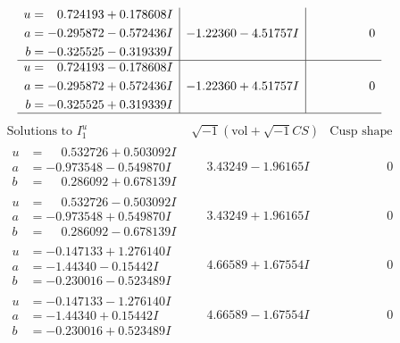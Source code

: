 \documentclass[1p]{elsarticle_modified}
\theoremstyle{definition}
\newcommand{\I}{\sqrt{-1}}
\begin{document}
$$\begin{array}{c|c|c}
\begin{aligned}
u &= \phantom{-}0.724193 + 0.178608 I \\
a &= -0.295872 - 0.572436 I \\
b &= -0.325525 - 0.319339 I\end{aligned}
 & -1.22360 - 4.51757 I & \phantom{-0.000000 } 0 \\ \hline\begin{aligned}
u &= \phantom{-}0.724193 - 0.178608 I \\
a &= -0.295872 + 0.572436 I \\
b &= -0.325525 + 0.319339 I\end{aligned}
 & -1.22360 + 4.51757 I & \phantom{-0.000000 } 0\\
 \hline 
 \end{array}$$\newpage$$\begin{array}{c|c|c}  
\text{Solutions to }I^u_{1}& \I (\text{vol} + \sqrt{-1}CS) & \text{Cusp shape}\\
 \hline 
\begin{aligned}
u &= \phantom{-}0.532726 + 0.503092 I \\
a &= -0.973548 - 0.549870 I \\
b &= \phantom{-}0.286092 + 0.678139 I\end{aligned}
 & \phantom{-}3.43249 - 1.96165 I & \phantom{-0.000000 } 0 \\ \hline\begin{aligned}
u &= \phantom{-}0.532726 - 0.503092 I \\
a &= -0.973548 + 0.549870 I \\
b &= \phantom{-}0.286092 - 0.678139 I\end{aligned}
 & \phantom{-}3.43249 + 1.96165 I & \phantom{-0.000000 } 0 \\ \hline\begin{aligned}
u &= -0.147133 + 1.276140 I \\
a &= -1.44340 - 0.15442 I \\
b &= -0.230016 - 0.523489 I\end{aligned}
 & \phantom{-}4.66589 + 1.67554 I & \phantom{-0.000000 } 0 \\ \hline\begin{aligned}
u &= -0.147133 - 1.276140 I \\
a &= -1.44340 + 0.15442 I \\
b &= -0.230016 + 0.523489 I\end{aligned}
 & \phantom{-}4.66589 - 1.67554 I & \phantom{-0.000000 } 0 \\ \hline\begin{aligned}

\end{aligned}
\end{array}$$
\end{document}
